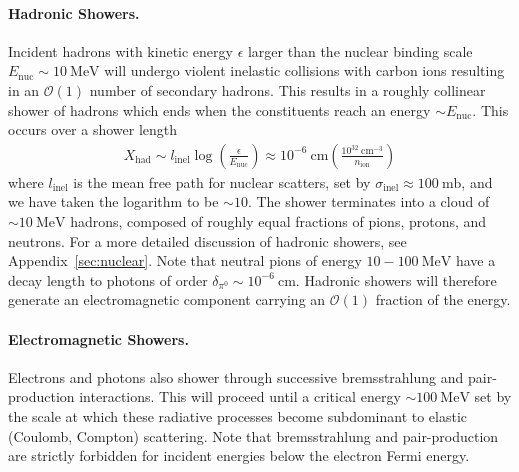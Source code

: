 \documentclass[twocolumn, preprintnumbers,amsmath,amssymb,prd, superscriptaddress]{revtex4}
\newcommand{\OO}{\mathcal{O}}
\newcommand{\MeV}{\text{MeV}}
\def\r{\right)}
\def\l{\left(}
\begin{document}
\paragraph{Hadronic Showers.}
Incident hadrons with kinetic energy $\epsilon$ larger than the nuclear binding scale $E_\text{nuc} \sim 10~\MeV$ will undergo violent inelastic collisions with carbon ions resulting in an $\OO(1)$ number of secondary hadrons.
This results in a roughly collinear shower of hadrons which ends when the constituents reach an energy $\sim E_\text{nuc}$.
This occurs over a shower length
\begin{align}
\label{eq:hadlength}
  X_\text{had} \sim l_\text{inel} \log\l\frac{\epsilon}{E_\text{nuc}}\r
  \approx 10^{-6} ~\text{cm} \l\frac{10^{32}~\text{cm}^{-3}}{n_\text{ion}}\r
\end{align}
where $l_\text{inel}$ is the mean free path for nuclear scatters, set by $\sigma_\text{inel} \approx 100 ~\text{mb}$, and we have taken the logarithm to be $\sim 10$.
The shower terminates into a cloud of $\sim 10~\MeV$ hadrons, composed of roughly equal fractions of pions, protons, and neutrons.
For a more detailed discussion of hadronic showers, see Appendix~\ref{sec:nuclear}.
Note that neutral pions of energy $10 - 100 ~\text{MeV}$ have a decay length to photons of order $\delta_{\pi^0} \sim 10^{-6} ~\text{cm}$.
Hadronic showers will therefore generate an electromagnetic component carrying an $\OO(1)$ fraction of the energy.

\paragraph{Electromagnetic Showers.}
Electrons and photons also shower through successive bremsstrahlung and pair-production interactions.
This will proceed until a critical energy $\sim 100 ~\MeV$ set by the scale at which these radiative processes become subdominant to elastic (Coulomb, Compton) scattering.
Note that bremsstrahlung and pair-production are strictly forbidden for incident energies below the electron Fermi energy.
\end{document}
